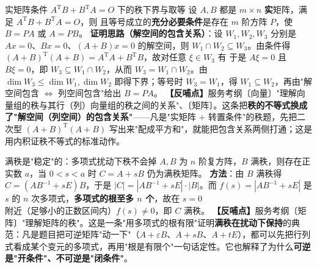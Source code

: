 \begin{fdeep}{实矩阵条件 $A^{\mathrm T}B+B^{\mathrm T}A=O$ 下的秩下界与取等}
设 $A,B$ 都是 $m\times n$ \textbf{实}矩阵，满足 $A^{\mathrm T}B+B^{\mathrm T}A=O$，则
且等号成立的\textbf{充分必要条件}是存在 $m$ 阶方阵 $P$，使 $B=PA$ 或 $A=PB$。
\textbf{证明思路（解空间的包含关系）}：设 $W_1,W_2,W_3$ 分别是 $Ax=0$、$Bx=0$、$(A+B)x=0$ 的解空间，则 $W_1\cap W_2\subseteq W_3$。由条件得 $(A+B)^{\mathrm T}(A+B)=A^{\mathrm T}A+B^{\mathrm T}B$，故对任意 $\xi\in W_3$ 有
于是 $A\xi=0$ 且 $B\xi=0$，即 $W_3\subseteq W_1\cap W_2$，从而 $W_3=W_1\cap W_2$。由 $\dim W_3\le\dim W_1,\dim W_2$ 即得下界；等号时 $W_3=W_1$，得 $W_1\subseteq W_2$，再由"解空间包含 $\iff$ 列空间包含"给出 $B=PA$。
\textbf{【反哺点】}服务考纲〔向量〕"理解向量组的秩与其行（列）向量组的秩之间的关系"、〔矩阵〕。这条把\textbf{秩的不等式换成了"解空间（列空间）的包含关系"}——凡是"实矩阵 $+$ 转置条件"的秩题，先把二次型 $(A+B)^{\mathrm T}(A+B)$ 写出来"配成平方和"，就能把包含关系两侧打通；这是用内积证秩不等式的标准动作。
\end{fdeep}


\begin{fdeep}{满秩是"稳定"的：多项式扰动下秩不会掉}
$A,B$ 为 $n$ 阶复方阵，$B$ 满秩，则存在正实数 $a$，当 $0<s<a$ 时 $C=A+sB$ 仍为满秩矩阵。
\textbf{方法}：由 $B$ 满秩得 $C=(AB^{-1}+sE)B$，于是 $|C|=|AB^{-1}+sE|\cdot|B|$。而 $f(s)=|AB^{-1}+sE|$ 是 $s$ 的 $n$ 次多项式，\textbf{多项式的根至多 $n$ 个}，故在 $s=0$ 附近（足够小的正数区间内）$f(s)\ne0$，即 $C$ 满秩。
\textbf{【反哺点】}服务考纲〔矩阵〕"理解矩阵的秩"。这是一条"用多项式的根有限"证明\textbf{满秩在扰动下保持}的典范：凡是题目把可逆矩阵"动一下"（$A+\varepsilon B$、$A+sB$、$A+tE$），都可以先把行列式看成某个变元的多项式，再用"根是有限个"一句话定性。它也解释了为什么\textbf{可逆是"开条件"、不可逆是"闭条件"}。
\end{fdeep}



